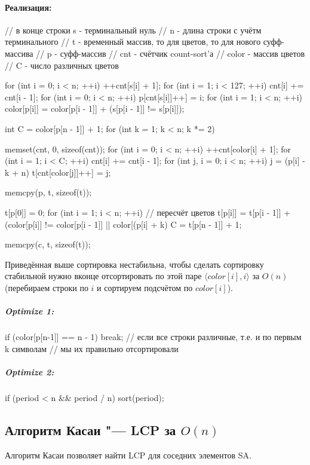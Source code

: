 \paragraph*{Реализация:}
\begin{cppcode}
// в конце строки s - терминальный нуль
// n - длина строки с учётм терминального
// t - временный массив, то для цветов, то для нового суфф-массива
// p - суфф-массив
// cnt - счётчик count-sort'а
// color - массив цветов
// C - число различных цветов

for (int i = 0; i < n; ++i)
		++cnt[s[i] + 1];
for (int i = 1; i < 127; ++i)
		cnt[i] += cnt[i - 1];
for (int i = 0; i < n; ++i)
		p[cnt[s[i]]++] = i;
for (int i = 1; i < n; ++i)
		color[p[i]] = color[p[i - 1]] + (s[p[i - 1]] != s[p[i]]);
	
int C = color[p[n - 1]] + 1;
for (int k = 1; k < n; k *= 2) {
		memset(cnt, 0, sizeof(cnt));
	for (int i = 0; i < n; ++i)
			++cnt[color[i] + 1];
	for (int i = 1; i < C; ++i)
			cnt[i] += cnt[i - 1];
	for (int j, i = 0; i < n; ++i) {
			j = (p[i] - k + n) %
			t[cnt[color[j]]++] = j;
	}
	
	memcpy(p, t, sizeof(t));
	
	t[p[0]] = 0;
	for (int i = 1; i < n; ++i) // пересчёт цветов
		t[p[i]] = t[p[i - 1]] + (color[p[i]] != color[p[i - 1]] || color[(p[i] + k) %
	C = t[p[n - 1]] + 1;
	
	memcpy(c, t, sizeof(t));
}
\end{cppcode}

Приведённая выше сортировка нестабильна, чтобы сделать сортировку стабильной нужно вконце отсортировать 
по этой паре	$\langle color[i], i \rangle$ за $O(n)$ (перебираем строки по $i$ и сортируем подсчётом по $color[i]$).

\subparagraph{Optimize 1:}
\begin{cppcode} 
	if (color[p[n-1]] == n - 1) break;
		// если все строки различные, т.е. и по первым k символам
		// мы их правильно отсортировали
\end{cppcode} 

\subparagraph{Optimize 2:}
\begin{cppcode} 
	if (period < n && period / n) 
		sort(period);
\end{cppcode}

\subsection{Алгоритм Касаи "--- LCP за \texorpdfstring{$O(n)$}{O(n)}}
Алгоритм Касаи позволяет найти LCP для соседних элементов SA.

